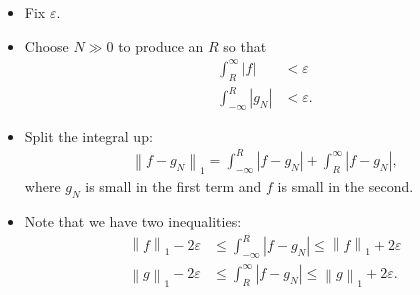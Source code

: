 \begin{solution}

\envlist

\begin{itemize}
\item
  Fix \(\varepsilon\).
\item
  Choose \(N\gg 0\) to produce an \(R\) so that
  \begin{align*}
  \int_R^{\infty } {\left\lvert {f} \right\rvert} &< \varepsilon\\
  \int_{-\infty}^{R} {\left\lvert {g_N} \right\rvert} &< \varepsilon
  .\end{align*}
\item
  Split the integral up:
  \begin{align*}
  {\left\lVert {f - g_N} \right\rVert}_1 = \int_{-\infty}^R {\left\lvert {f - g_N} \right\rvert} + \int_R^{\infty }{\left\lvert {f - g_N} \right\rvert}
  ,\end{align*}
  where \(g_N\) is small in the first term and \(f\) is small in the
  second.
\item
  Note that we have two inequalities:
  \begin{align*}
  {\left\lVert {f} \right\rVert}_1 - 2\varepsilon&\leq \int_{-\infty}^{R} {\left\lvert {f -g_N} \right\rvert} \leq {\left\lVert {f} \right\rVert}_1 + 2\varepsilon\\
  {\left\lVert {g} \right\rVert}_1 - 2\varepsilon&\leq \int^{\infty}_{R} {\left\lvert {f -g_N} \right\rvert} \leq {\left\lVert {g} \right\rVert}_1 + 2\varepsilon
  .\end{align*}
\end{itemize}



\end{solution}
